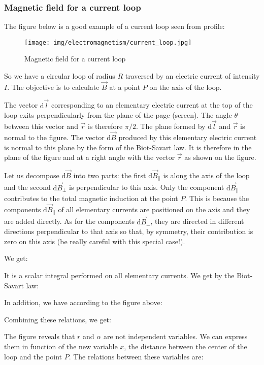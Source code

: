 	\subsubsection{Magnetic field for a current loop}
	The figure below is a good example of a current loop seen from profile:
	\begin{figure}[H]
		\centering
		\texttt{[image: img/electromagnetism/current\_loop.jpg]}
		\caption{Magnetic field for a current loop}
	\end{figure}
	So we have a circular loop of radius $R$ traversed by an electric current of intensity $I$. The objective is to calculate $\vec{B}$ at a point $P$ on the axis of the loop.
	
	The vector $\mathrm{d}\vec{l}$ corresponding to an elementary electric current at the top of the loop exits perpendicularly from the plane of the page (screen). The angle $\theta$ between this vector and $\vec{r}$ is therefore $\pi/2$. The plane formed by $\mathrm{d}\vec{l}$ and $\vec{r}$ is normal to the figure. The vector $\mathrm{d}\vec{B}$ produced by this elementary electric current is normal to this plane by the form of the Biot-Savart law. It is therefore in the plane of the figure and at a right angle with the vector $\vec{r}$ as shown on the figure.
	
	Let us decompose $\mathrm{d}\vec{B}$ into two parts: the first $\mathrm{d}\vec{B}_{||}$ is along the axis of the loop and the second $\mathrm{d}\vec{B}_{\perp}$ is perpendicular to this axis. Only the component $\mathrm{d}\vec{B}_{||}$ contributes to the total magnetic induction at the point $P$. This is because the components $\mathrm{d}\vec{B}_{||}$ of all elementary currents are positioned on the axis and they are added directly. As for the components $\mathrm{d}\vec{B}_{\perp}$, they are directed in different directions perpendicular to that axis so that, by symmetry, their contribution is zero on this axis (be really careful with this special case!).
	
	 We get:
	
	It is a scalar integral performed on all elementary currents. We get by the Biot-Savart law:
	
	In addition, we have according to the figure above:
	
	Combining these relations, we get:
	
	The figure reveals that $r$ and $\alpha$ are not independent variables. We can express them in function of the new variable $x$, the distance between the center of the loop and the point $P$. The relations between these variables are:
	
